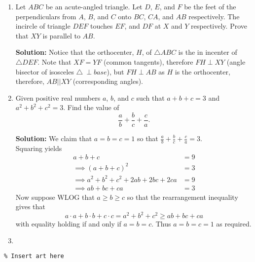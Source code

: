 \documentclass{article}
\begin{document}
\begin{enumerate}[itemsep=\fill]
\item %
Let $ABC$ be an acute-angled triangle. Let $D$, $E$, and $F$ be the feet of the perpendiculars from $A$, $B$, and $C$ onto $BC$, $CA$, and $AB$ respectively. The incircle of triangle $DEF$ touches $EF$, and $DF$ at $X$ and $Y$ respectively. Prove that $XY$ is parallel to $AB$.

\textbf{Solution:} Notice that the orthocenter, $H$, of $\triangle ABC$ is the in incenter of $\triangle DEF$. Note that $XF=YF$ (common tangents), therefore $FH \perp XY$ (angle bisector of isosceles $\triangle\ \perp base$), but $FH \perp AB$ as $H$ is the orthocenter, therefore, $AB || XY$ (corresponding angles).

\item %
Given positive real numbers $a$, $b$, and $c$ such that $a+b+c = 3$ and $a^2+b^2+c^2 = 3$. Find the value of \[\frac{a}{b} +\frac{b}{c} +\frac{c}{a}.\]

\textbf{Solution:} We claim that $a=b=c=1$ so that $\frac{a}{b} +\frac{b}{c} +\frac{c}{a} = 3$. 
\\ Squaring yields 
\begin{align*}
	a+b+c &= 9
	\\ \implies (a+b+c)^2 &= 3
	\\ \implies a^2+b^2+c^2 + 2ab + 2bc + 2ca &= 9
	\\ \implies ab + bc + ca &= 3
\end{align*}
Now suppose WLOG that $a \geq b \geq c$ so that the rearrangement inequality gives that
$$a \cdot a + b \cdot b + c \cdot c = a^2+b^2+c^2 \geq ab + bc +ca$$
with equality holding if and only if $a=b=c$. 
Thus $a=b=c=1$ as required. 

\item %


\end{enumerate}


\centering
\small
\begin{BVerbatim}
\end{BVerbatim}
\end{document}

